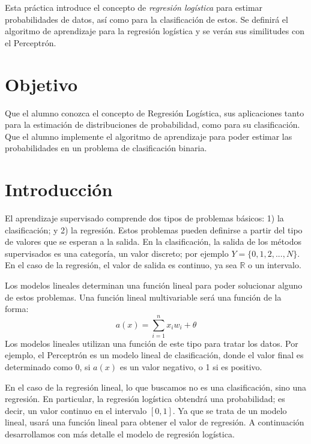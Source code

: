 
Esta práctica introduce el concepto de \emph{regresión logística} para estimar probabilidades de datos, así como para la clasificación de estos. Se definirá el algoritmo de aprendizaje para la regresión logística y se verán sus similitudes con el Perceptrón.


\section{Objetivo}

Que el alumno conozca el concepto de Regresión Logística, sus aplicaciones tanto para la estimación de distribuciones de probabilidad, como para su clasificación. Que el alumno implemente el algoritmo de aprendizaje para poder estimar las probabilidades en un problema de clasificación binaria.

\section{Introducción}

El aprendizaje supervisado comprende dos tipos de problemas básicos: 1) la clasificación; y 2) la regresión. Estos problemas pueden definirse a partir del tipo de valores que se esperan a la salida. En la clasificación, la salida de los métodos supervisados es una categoría, un valor discreto; por ejemplo $Y = \{0,1,2,...,N\}$. En el caso de la regresión, el valor de salida es continuo, ya sea $\mathbb{R}$ o un intervalo.

Los modelos lineales determinan una función lineal para poder solucionar alguno de estos problemas. Una función lineal multivariable será una función de la forma: $$a(x) = \sum_{i=1}^n x_iw_i + \theta$$
Los modelos lineales utilizan una función de este tipo para tratar los datos. Por ejemplo, el Perceptrón es un modelo lineal de clasificación, donde el valor final es determinado como 0, si $a(x)$ es un valor negativo, o 1 si es positivo.

En el caso de la regresión lineal, lo que buscamos no es una clasificación, sino una regresión. En particular, la regresión logística obtendrá una probabilidad; es decir, un valor continuo en el intervalo $[0,1]$. Ya que se trata de un modelo lineal, usará una función lineal para obtener el valor de regresión. A continuación desarrollamos con más detalle el modelo de regresión logística.  

